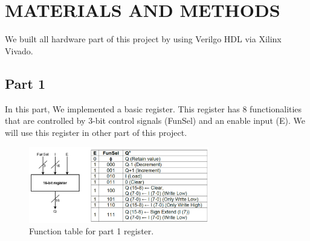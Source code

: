 \documentclass[pdftex,12pt,a4paper]{article}
\begin{document}
\section{MATERIALS AND METHODS}
We built all hardware part of this project by using Verilgo HDL via Xilinx Vivado.
\subsection{Part 1}
In this part, We implemented a basic register. This register has 8 functionalities that are controlled
by 3-bit control signals (FunSel) and an enable input (E). We will use this register in other part of this project.
\begin{figure}[htbp]
	\centering
	\includegraphics[width=0.7\textwidth]{Part 1 Image}
	\caption{Function table for part 1 register.}
\end{figure}
\end{document}
